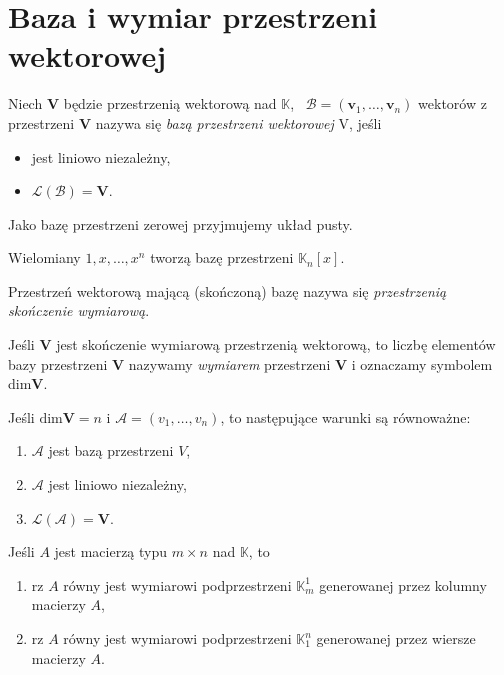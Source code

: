  	 
 	\section{Baza i wymiar przestrzeni wektorowej}
 	\begin{df}
 		Niech \textbf{V} będzie przestrzenią wektorową nad $\mathbb{K}$, \, $\mathcal{B} =(\textbf{v}_1, \ldots, \textbf{v}_n)$ wektorów z przestrzeni \textbf{V} nazywa się \textit{bazą przestrzeni wektorowej} V, jeśli
 		\begin{itemize}
 			\item jest liniowo niezależny,
 			\item $\mathcal{L}(\mathcal{B}) = \textbf{V}$.
 		\end{itemize}
 		Jako bazę przestrzeni zerowej przyjmujemy układ pusty.
 	\end{df}
 	
 	\begin{przyk}
 		Wielomiany $1, x, \ldots, x^n$ tworzą bazę przestrzeni $\mathbb{K}_n[x]$.
 	\end{przyk}
 	
 	\begin{uwg}
 		Przestrzeń wektorową mającą (skończoną) bazę nazywa się \textit{przestrzenią skończenie wymiarową}.
 	\end{uwg}
	
	Jeśli \textbf{V} jest skończenie wymiarową przestrzenią wektorową, to liczbę elementów bazy przestrzeni \textbf{V} 	nazywamy \textit{wymiarem} przestrzeni \textbf{V} i oznaczamy symbolem dim\textbf{V}.
	
 	\begin{tw}
 		Jeśli $\text{dim} \textbf{V} = n$ i $\mathcal{A}=( \textit{v}_1, \ldots, \textit{v}_n)$, to następujące warunki są równoważne:
 		\begin{enumerate}
 			\item $\mathcal{A}$ jest bazą przestrzeni $V$, 
 			\item $\mathcal{A}$ jest liniowo niezależny,
 			\item $\mathcal{L}(\mathcal{A}) = \textbf{V}$.
 		\end{enumerate}
 	\end{tw}

	\begin{tw}
		Jeśli $A$ jest macierzą typu $m \times n$ nad $\mathbb{K}$, to
		\begin{enumerate}
			\item rz $A$ równy jest wymiarowi podprzestrzeni $\mathbb{K}^1_m$ generowanej przez kolumny macierzy $A$,
			\item rz $A$ równy jest wymiarowi podprzestrzeni $\mathbb{K}^n_1$ generowanej przez wiersze macierzy $A$.
		\end{enumerate}
	\end{tw}
	
